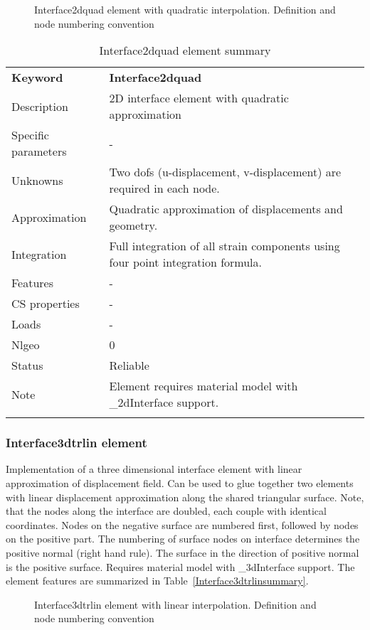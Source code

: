\documentclass[a4paper]{article}
\newcommand{\param}[1]{\texttt{#1}} %
\newcommand{\templabel}{}%
\newcommand{\tempcaption}{}%
\newcounter{nelpar}
\newenvironment{elementsummary}[5]{%
  \gdef\tempcaption{#4}%
  \gdef\templabel{#5}%
  \setcounter{nelpar}{0}%
  \begin{center} %
    \begin{table}[!htb] %
      \begin{tabular}{|l|p{9cm}|}\hline %
        {\bf Keyword} & \bf{#1}\\ %
        {Description} & {#2}\\ %
        {Specific parameters} & {#3}\\ \hline %
}{%
  \\ \hline %
      \end{tabular}%
      \caption{\tempcaption}%
      \label{\templabel}%
    \end{table}%
  \end{center}%
}
\newcommand{\elementParam}[1]{%
  \ifthenelse{\value{nelpar}>0} %
             {&{#1}}%
             {\setcounter{nelpar}{1}Parameters&{#1}}%
             \\%
}
\newcommand{\elementDescription}[2]{{#1} & {#2}\\ }
\begin{document}
\begin{figure}[htb]
 \centering
 \begin{makeimage}
 
 \end{makeimage}
 \caption{Interface2dquad element with quadratic interpolation. Definition and node numbering convention}
 \label{interf2d_quad_fig}
\end{figure}

\begin{elementsummary}{Interface2dquad}{2D  interface element with quadratic approximation}{-}{Interface2dquad element summary}{Interface2dquadsummary}
\elementDescription{Unknowns}{Two dofs (u-displacement, v-displacement) are required in each node.}
\elementDescription{Approximation}{Quadratic approximation of displacements and geometry.}
\elementDescription{Integration}{Full integration of all strain components using four point integration formula.}
\elementDescription{Features}{-}
\elementDescription{CS properties}{-}
\elementDescription{Loads}{-}
\elementDescription{Nlgeo}{0}
\elementDescription{Status}{Reliable}
\elementDescription{Note}{Element requires material model with \_2dInterface support.}
\end{elementsummary}

\subsubsection{Interface3dtrlin element}
Implementation of a three dimensional interface element with linear
approximation of displacement field. Can be used to glue together two elements with linear displacement approximation along the shared triangular surface. Note, that the nodes along the interface are doubled, each couple with identical coordinates. Nodes on the negative surface are numbered first, followed by nodes on the positive part. The numbering of surface nodes on interface determines the positive normal (right hand rule). The surface in the direction of positive normal is the positive surface. Requires material model with \_3dInterface support. The element features are summarized in Table~\ref{Interface3dtrlinsummary}.

\begin{figure}[htb]
 \centering
 \begin{makeimage}
  
 \end{makeimage}
 \caption{Interface3dtrlin element with linear interpolation. Definition and node numbering convention}
 \label{interf3d_lin_fig}
\end{figure}
\end{document}

